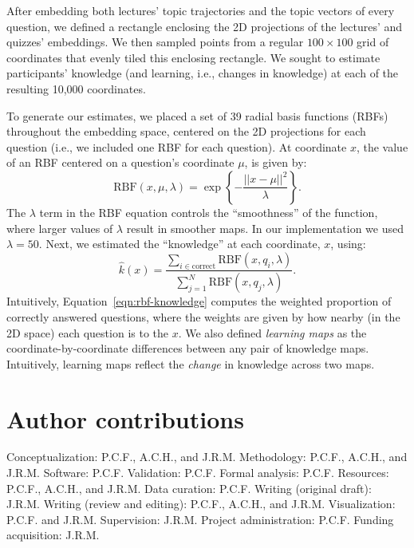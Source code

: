 \documentclass[10pt]{article}
\begin{document}
After embedding both lectures' topic trajectories and the topic vectors of
every question, we defined a rectangle enclosing the 2D projections of the
lectures' and quizzes' embeddings. We then sampled points from a regular $100
\times 100$ grid of coordinates that evenly tiled this enclosing rectangle. We
sought to estimate participants' knowledge (and learning, i.e., changes in
knowledge) at each of the resulting 10,000 coordinates.

To generate our estimates, we placed a set of 39 radial basis functions (RBFs)
throughout the embedding space, centered on the 2D projections for each
question (i.e., we included one RBF for each question). At coordinate $x$, the
value of an RBF centered on a question's coordinate $\mu$, is given by:
\begin{equation}
    \mathrm{RBF}(x, \mu, \lambda) = \exp\left\{-\frac{||x - \mu||^2}{\lambda}\right\}.
    \label{eqn:rbf}
\end{equation}
The $\lambda$ term in the RBF equation controls the ``smoothness'' of the
function, where larger values of $\lambda$ result in smoother maps. In our
implementation we used $\lambda = 50$.  Next, we estimated the ``knowledge''
at each coordinate, $x$, using:
\begin{equation}
    \hat{k}(x) = \frac{\sum_{i \in \mathrm{correct}} \mathrm{RBF}(x, q_i, \lambda)}{\sum_{j = 1}^N \mathrm{RBF}(x, q_j, \lambda)}.
    \label{eqn:rbf-knowledge}
\end{equation}
Intuitively, Equation~\ref{eqn:rbf-knowledge} computes the weighted proportion of
correctly answered questions, where the weights are given by how nearby (in the 2D space)
each question is to the $x$.  We also defined \textit{learning maps} as the coordinate-by-coordinate
differences between any pair of knowledge maps.  Intuitively, learning maps reflect the \textit{change}
in knowledge across two maps.

\section*{Author contributions}

Conceptualization: P.C.F., A.C.H., and J.R.M. Methodology: P.C.F., A.C.H., and
J.R.M. Software: P.C.F. Validation: P.C.F. Formal analysis: P.C.F. Resources: P.C.F.,
A.C.H., and J.R.M. Data curation: P.C.F. Writing (original draft): J.R.M. Writing
(review and editing): P.C.F., A.C.H., and J.R.M. Visualization: P.C.F. and J.R.M.
Supervision: J.R.M. Project administration: P.C.F. Funding acquisition: J.R.M.
\end{document}
